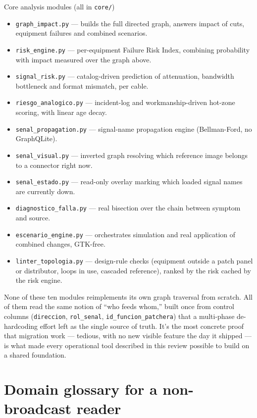 \documentclass[10.4pt,twocolumn]{article}
\begin{document}
\begin{specbox}{Core analysis modules (all in \texttt{core/})}
\begin{itemize}[leftmargin=1.0em,itemsep=2pt,topsep=2pt]
\item \texttt{graph\_impact.py} --- builds the full directed graph, answers impact of cuts, equipment failures and combined scenarios.
\item \texttt{risk\_engine.py} --- per-equipment Failure Risk Index, combining probability with impact measured over the graph above.
\item \texttt{signal\_risk.py} --- catalog-driven prediction of attenuation, bandwidth bottleneck and format mismatch, per cable.
\item \texttt{riesgo\_analogico.py} --- incident-log and workmanship-driven hot-zone scoring, with linear age decay.
\item \texttt{senal\_propagation.py} --- signal-name propagation engine (Bellman-Ford, no GraphQLite).
\item \texttt{senal\_visual.py} --- inverted graph resolving which reference image belongs to a connector right now.
\item \texttt{senal\_estado.py} --- read-only overlay marking which loaded signal names are currently down.
\item \texttt{diagnostico\_falla.py} --- real bisection over the chain between symptom and source.
\item \texttt{escenario\_engine.py} --- orchestrates simulation and real application of combined changes, GTK-free.
\item \texttt{linter\_topologia.py} --- design-rule checks (equipment outside a patch panel or distributor, loops in use, cascaded reference), ranked by the risk cached by the risk engine.
\end{itemize}
\end{specbox}

None of these ten modules reimplements its own graph traversal from scratch. All of them read the same notion of ``who feeds whom,'' built once from control columns (\texttt{direccion}, \texttt{rol\_senal}, \texttt{id\_funcion\_patchera}) that a multi-phase de-hardcoding effort left as the single source of truth. It's the most concrete proof that migration work --- tedious, with no new visible feature the day it shipped --- is what made every operational tool described in this review possible to build on a shared foundation.

\section{Domain glossary for a non-broadcast reader}
\end{document}
